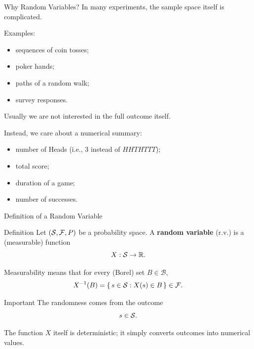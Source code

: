 \begin{frame}{Why Random Variables?}
In many experiments, the sample space itself is complicated.

\vspace{0.25cm}

Examples:
\begin{itemize}
    \item sequences of coin tosses;
    \item poker hands;
    \item paths of a random walk;
    \item survey responses.
\end{itemize}

\vspace{0.25cm}

Usually we are not interested in the full outcome itself.

\vspace{0.25cm}

Instead, we care about a numerical summary:
\begin{itemize}
    \item number of Heads (i.e., 3 instead of $HHTHTTT$);
    \item total score;
    \item duration of a game;
    \item number of successes.
\end{itemize}
\end{frame}
\begin{frame}{Definition of a Random Variable}

\begin{keybox}{Definition}
Let $(\mathcal{S},\mathcal{F},P)$ be a probability space. A \textbf{random variable} (r.v.) is a (measurable) function
\[
X:\mathcal{S} \to \mathbb{R}.
\]
\end{keybox}

\vspace{0.25cm}

Measurability means that for every (Borel) set $B\in\mathcal{B}$,
\[
X^{-1}(B)
=
\{\,s\in\mathcal{S} : X(s)\in B\,\}
\in \mathcal{F}.
\]

\begin{keybox}{Important}
The randomness comes from the outcome
\[
s\in\mathcal{S}.
\]

The function $X$ itself is deterministic; it simply converts outcomes into numerical values.
\end{keybox}

\end{frame}

